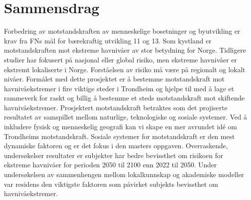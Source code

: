 \section{Sammensdrag}
Forbedring av motstandskraften av menneskelige bosetninger og byutvikling er krav fra FNs mål for bærekraftig utvikling 11 og 13. Som kystland er motstandskraften mot ekstreme havnivåer av stor betydning for Norge. Tidligere studier har fokusert på nasjonal eller global risiko, men ekstreme havnivåer er ekstremt lokaliserte i Norge. Forståelsen av risiko må være på regionalt og lokalt nivåer. Formålet med dette prosjektet er å bestemme motstandskraft mot havnivåekstremer i fire viktige steder i Trondheim og hjelpe til med å lage et rammeverk for raskt og billig å bestemme et steds motstandskraft mot skiftende havnivåekstremer. Prosjektert motstandskraft betraktes som det projiserte resultatet av samspillet mellom naturlige, teknologiske og sosiale systemer. Ved å inkludere fysisk og menneskelig geografi kan vi skape en mer avrundet idé om Trondheims motstandskraft.
Sosiale systemer for motstandskraft er den mest dynamiske faktoren og er det fokus i den masters oppgaven. Overraskende, undersøkelser resultater er subjekter har bedre bevissthet om risikoen for ekstreme havnivåer for perioden 2050 til 2100 enn 2022 til 2050. Under undersøkelsen av sammenhengen mellom lokalkunnskap og akademiske modeller var residens den viktigste faktoren som påvirket subjekts bevissthet om havnivåekstremer.